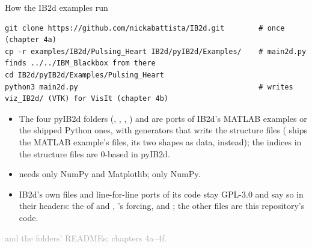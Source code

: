 \documentclass[aspectratio=169,11pt]{beamer}
\newcommand{\sourcecredit}[1]{\vfill\begin{flushright}\tiny\textcolor{DarkGray}{#1}\end{flushright}}
\begin{document}
\begin{frame}[fragile]{How the IB2d examples run}
\label{fr:howib2d}
\begin{lstlisting}[style=shell]
git clone https://github.com/nickabattista/IB2d.git        # once (chapter 4a)
cp -r examples/IB2d/Pulsing_Heart IB2d/pyIB2d/Examples/    # main2d.py finds ../../IBM_Blackbox from there
cd IB2d/pyIB2d/Examples/Pulsing_Heart
python3 main2d.py                                          # writes viz_IB2d/ (VTK) for VisIt (chapter 4b)
\end{lstlisting}
\footnotesize
\begin{itemize}\setlength{\itemsep}{1pt}
  \item The four pyIB2d folders (, , , ) and  are ports of IB2d's MATLAB examples or the shipped Python ones, with generators that write the structure files ( ships the MATLAB example's files, its two shapes as data, instead); the indices in the structure files are 0-based in pyIB2d.
  \item {} needs only NumPy and Matplotlib;  only NumPy.
  \item IB2d's own files and line-for-line ports of its code stay GPL-3.0 and say so in their headers: the  of  and , 's forcing,  and ; the other  files are this repository's code.
\end{itemize}
\sourcecredit{ and the folders' READMEs; chapters 4a--4f.}
\end{frame}
\end{document}
